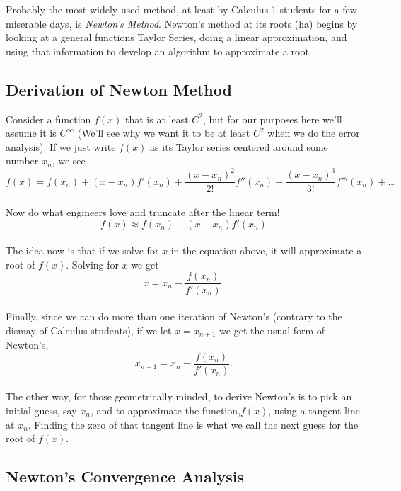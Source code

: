 \documentclass[paper=a4, fontsize=11pt]{scrartcl} %
\numberwithin{equation}{section} %
\numberwithin{figure}{section} %
\numberwithin{table}{section} %
\begin{document}
Probably the most widely used method, at least by Calculus 1 students for a few miserable days, is \emph{Newton's Method}. Newton's method at its roots (ha) begins by looking at a general functions Taylor Series, doing a linear approximation, and using that information to develop an algorithm to approximate a root.\\

\subsection{Derivation of Newton Method}

Consider a function $f(x)$ that is at least $C^2$, but for our purposes here we'll assume it is $C^\infty$ (We'll see why we want it to be at least $C^2$ when we do the error analysis). If we just write $f(x)$ as its Taylor series centered around some number $x_n$, we see\\

$$f(x) = f(x_n) + (x-x_n) f'(x_n) + \frac{(x-x_n)^2}{2!} f''(x_n) + \frac{(x-x_n)^3}{3!} f'''(x_n) + ...$$\\

Now do what engineers love and truncate after the linear term! \\

$$f(x) \approx f(x_n) + (x-x_n) f'(x_n)$$\\

The idea now is that if we solve for $x$ in the equation above, it will approximate a root of $f(x)$. Solving for $x$ we get \\

$$x = x_n - \frac{ f(x_n) }{ f'(x_n) }.$$\\

Finally, since we can do more than one iteration of Newton's (contrary to the dismay of Calculus students), if we let $x=x_{n+1}$ we get the usual form of Newton's, \\

$$x_{n+1} = x_n - \frac{ f(x_n) }{ f'(x_n) }.$$\\

The other way, for those geometrically minded, to derive Newton's is to pick an initial guess, say $x_n$, and to approximate the function,$f(x)$, using a tangent line at $x_n$. Finding the zero of that tangent line is what we call the next guess for the root of $f(x)$.\\

\subsection{Newton's Convergence Analysis}
\end{document}
